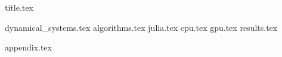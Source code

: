 \documentclass[12pt,a4paper,twoside]{article}
\numberwithin{figure}{section}
\numberwithin{equation}{section}
\theoremstyle{definition}
\theoremstyle{remark}
\theoremstyle{remark}
\begin{document}
{title.tex}

\pagestyle{headings}
\raggedbottom

{dynamical_systems.tex}
{algorithms.tex}
{julia.tex}
{cpu.tex}
{gpu.tex}
{results.tex}

\FloatBarrier

\nocite{*}
\printbibliography

{}
{appendix.tex}
\end{document}
